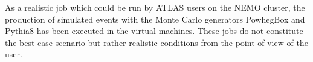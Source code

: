 As a realistic job which could be run by ATLAS users on the NEMO
cluster, the production of simulated events with the Monte Carlo
generators PowhegBox and Pythia8 has been executed in the virtual
machines.
These jobs do not constitute the best-case scenario but rather
realistic conditions from the point of view of the user.